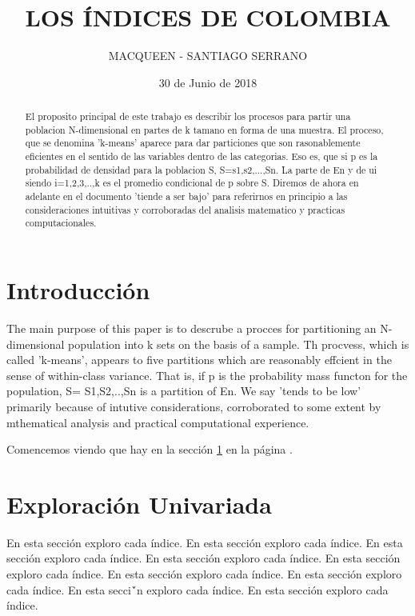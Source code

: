 \documentclass{article}
\title{LOS \'INDICES DE COLOMBIA}
\author[1]{\normalsize MACQUEEN - SANTIAGO SERRANO}
\affil[1,2]{\small  Escuela de Ingenier\'ia,Universidad de los Andes\\
\texttt{{delcurso,deallado}@uniandes.edu.col}}
\affil[1]{\small Instituto de altas investigaciones financieras\\
Banco del Parque\\
\texttt{delcurso@bp.com.col}}
\date{30 de Junio de 2018}
\begin{document}


\maketitle


\begin{abstract}
El proposito principal de este trabajo es describir los procesos para partir una poblacion N-dimensional en partes de k tamano en forma de una muestra. El proceso, que se denomina 'k-means' aparece para dar particiones que son rasonablemente eficientes en el sentido de las variables dentro de las categorias. Eso es, que si p es la probabilidad de densidad para la poblacion S, S=s1,s2,...,Sn. La parte de En y de ui siendo i=1,2,3,..,k es el promedio condicional de p sobre S. Diremos de ahora en adelante en el documento 'tiende a ser bajo' para referirnos en principio a las consideraciones intuitivas y corroboradas del analisis matematico y practicas computacionales.
\end{abstract}

\section*{Introducci\'on}

The main purpose of this paper is to descrube a procces for partitioning an N-dimensional population into k sets on the basis of a sample. Th procvess, which is called 'k-means', appears to five partitions which are reasonably effcient in the sense of within-class variance. That is, if p is the probability mass functon for the population, S= S1,S2,..,Sn is a partition of En. We say 'tends to be low' primarily because of intutive considerations, corroborated to some extent by mthematical analysis and practical computational experience.


Comencemos viendo que hay en la secci\'on \ref{univariada} en la p\'agina \pageref{univariada}.

\clearpage



\section{Exploraci\'on Univariada}\label{univariada}

En esta secci\'on exploro cada \'indice. En esta secci\'on exploro cada \'indice. En esta secci\'on exploro cada \'indice. En esta secci\'on exploro cada \'indice. En esta secci\'on exploro cada \'indice. En esta secci\'on exploro cada \'indice. En esta secci\'on exploro cada \'indice. En esta secci\'`n exploro cada \'indice. En esta secci\'on exploro cada \'indice.
\end{document}
